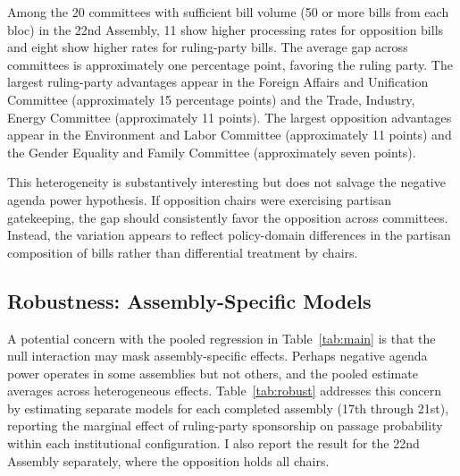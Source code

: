 \documentclass[11pt]{article}
\begin{document}
Among the 20 committees with sufficient bill volume (50 or more bills from each bloc) in the 22nd Assembly, 11 show higher processing rates for opposition bills and eight show higher rates for ruling-party bills. The average gap across committees is approximately one percentage point, favoring the ruling party. The largest ruling-party advantages appear in the Foreign Affairs and Unification Committee (approximately 15 percentage points) and the Trade, Industry, Energy Committee (approximately 11 points). The largest opposition advantages appear in the Environment and Labor Committee (approximately 11 points) and the Gender Equality and Family Committee (approximately seven points).

This heterogeneity is substantively interesting but does not salvage the negative agenda power hypothesis. If opposition chairs were exercising partisan gatekeeping, the gap should consistently favor the opposition across committees. Instead, the variation appears to reflect policy-domain differences in the partisan composition of bills rather than differential treatment by chairs.

\subsection{Robustness: Assembly-Specific Models}

A potential concern with the pooled regression in Table~\ref{tab:main} is that the null interaction may mask assembly-specific effects. Perhaps negative agenda power operates in some assemblies but not others, and the pooled estimate averages across heterogeneous effects. Table~\ref{tab:robust} addresses this concern by estimating separate models for each completed assembly (17th through 21st), reporting the marginal effect of ruling-party sponsorship on passage probability within each institutional configuration. I also report the result for the 22nd Assembly separately, where the opposition holds all chairs.
\end{document}
